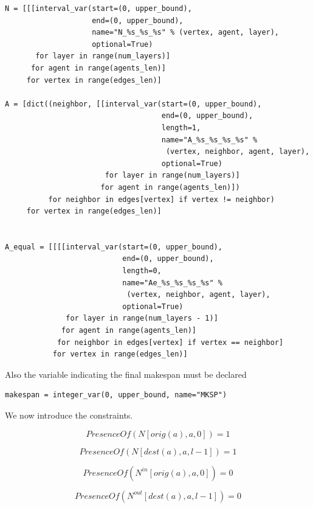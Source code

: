 \documentclass[12pt, a4paper, hidelinks]{article}
\numberwithin{equation}{section}
\begin{document}
\begin{lstlisting}[label={lst:variables2}]
N = [[[interval_var(start=(0, upper_bound),
                    end=(0, upper_bound),
                    name="N_%s_%s_%s" % (vertex, agent, layer),
                    optional=True)
       for layer in range(num_layers)]
      for agent in range(agents_len)]
     for vertex in range(edges_len)]

A = [dict((neighbor, [[interval_var(start=(0, upper_bound),
                                    end=(0, upper_bound),
                                    length=1,
                                    name="A_%s_%s_%s_%s" %
                                     (vertex, neighbor, agent, layer),
                                    optional=True)
                       for layer in range(num_layers)]
                      for agent in range(agents_len)])
          for neighbor in edges[vertex] if vertex != neighbor)
     for vertex in range(edges_len)]


A_equal = [[[[interval_var(start=(0, upper_bound),
                           end=(0, upper_bound),
                           length=0,
                           name="Ae_%s_%s_%s_%s" %
                            (vertex, neighbor, agent, layer),
                           optional=True)
              for layer in range(num_layers - 1)]
             for agent in range(agents_len)]
            for neighbor in edges[vertex] if vertex == neighbor]
           for vertex in range(edges_len)]
\end{lstlisting}

Also the variable indicating the final makespan must be declared
\begin{lstlisting}[label={lst:variablesmakespan}]
makespan = integer_var(0, upper_bound, name="MKSP")
\end{lstlisting}

We now introduce the constraints.
\begin{description}\label{eq:equation_set_2.1}
\item \begin{equation} PresenceOf(N[orig(a),a,0]) = 1 \label{eq:2.1}\end{equation}
\item \begin{equation} PresenceOf(N[dest(a),a,l-1]) = 1 \label{eq:2.2}\end{equation}
\item \begin{equation} PresenceOf(N^{in}[orig(a),a,0]) = 0 \label{eq:2.3}\end{equation}
\item \begin{equation} PresenceOf(N^{out}[dest(a),a,l-1]) = 0 \label{eq:2.4}\end{equation}
\end{description}
\end{document}
